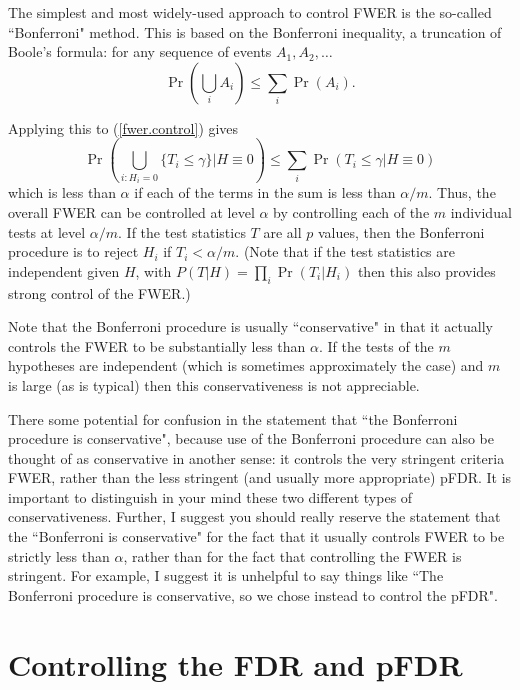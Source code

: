 \documentclass[times,11pt]{article}
\begin{document}
The simplest and most widely-used approach to control FWER is the so-called ``Bonferroni" method.
This is based on the Bonferroni inequality, a truncation of Boole's formula: for any sequence of events $A_1,A_2,\dots$
\begin{equation}
\Pr(\bigcup_i A_i) \leq \sum_i \Pr(A_i).
\end{equation}

Applying this to (\ref{fwer.control}) gives
\begin{equation} 
\Pr \left(\bigcup_{i:H_i =0} \{T_i \leq \gamma\} \bigg| H \equiv 0 \right) \leq \sum_i \Pr(T_i \leq \gamma | H \equiv 0)
\end{equation}
which is less than $\alpha$ if each of the terms in the sum is less than $\alpha/m$.
Thus, the overall FWER can be controlled at level $\alpha$ by controlling each of the $m$ individual tests at level $\alpha/m$. If the test statistics $T$ are
all $p$ values, then the Bonferroni procedure is to reject $H_i$ if $T_i < \alpha/m$. (Note that if the test statistics are independent given $H$, with $P(T | H) = \prod_i \Pr(T_i | H_i)$ then this also provides strong control of the FWER.)

Note that the Bonferroni procedure is usually ``conservative" in that it actually controls the
FWER to be substantially less than $\alpha$. If the tests of the $m$ hypotheses are independent (which is sometimes approximately the case) and $m$ is large (as is typical) then this conservativeness is not appreciable.

There some potential for confusion in the statement that ``the Bonferroni procedure is conservative", because use of the Bonferroni procedure can also be thought of as conservative in another sense: it controls the very stringent criteria FWER, rather than the less stringent (and usually more appropriate) pFDR. It is important to distinguish in your mind these two different types of conservativeness. Further, I suggest you should really reserve the statement that the ``Bonferroni is conservative" for the fact that it usually controls FWER to be strictly less than $\alpha$, rather
than for the fact that controlling the FWER is stringent.   For example, I suggest it is unhelpful to say things like ``The Bonferroni procedure is conservative, so we chose instead to control the pFDR". 

\section{Controlling the FDR and pFDR}
\end{document}
